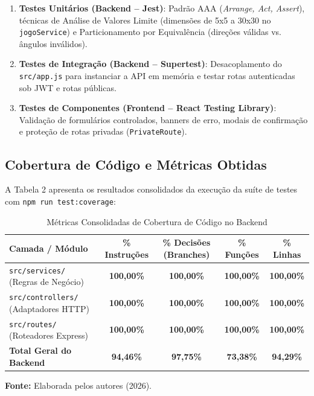 \documentclass[12pt,a4paper]{article}
\begin{document}
\begin{enumerate}
    \item \textbf{Testes Unitários (Backend -- Jest)}: Padrão AAA (\textit{Arrange, Act, Assert}), técnicas de Análise de Valores Limite (dimensões de 5x5 a 30x30 no \texttt{jogoService}) e Particionamento por Equivalência (direções válidas vs. ângulos inválidos).
    \item \textbf{Testes de Integração (Backend -- Supertest)}: Desacoplamento do \texttt{src/app.js} para instanciar a API em memória e testar rotas autenticadas sob JWT e rotas públicas.
    \item \textbf{Testes de Componentes (Frontend -- React Testing Library)}: Validação de formulários controlados, banners de erro, modais de confirmação e proteção de rotas privadas (\texttt{PrivateRoute}).
\end{enumerate}

\subsection{Cobertura de Código e Métricas Obtidas}
A Tabela 2 apresenta os resultados consolidados da execução da suíte de testes com \texttt{npm run test:coverage}:

\begin{table}[H]
\centering
\caption{Métricas Consolidadas de Cobertura de Código no Backend}
\label{tab:cobertura_abnt}
\small
\begin{tabularx}{\textwidth}{lcccc}
\toprule
\textbf{Camada / Módulo} & \textbf{\% Instruções} & \textbf{\% Decisões (Branches)} & \textbf{\% Funções} & \textbf{\% Linhas} \\
\midrule
\texttt{src/services/} (Regras de Negócio) & \textbf{100,00\%} & \textbf{100,00\%} & \textbf{100,00\%} & \textbf{100,00\%} \\
\texttt{src/controllers/} (Adaptadores HTTP) & \textbf{100,00\%} & \textbf{100,00\%} & \textbf{100,00\%} & \textbf{100,00\%} \\
\texttt{src/routes/} (Roteadores Express) & \textbf{100,00\%} & \textbf{100,00\%} & \textbf{100,00\%} & \textbf{100,00\%} \\
\midrule
\textbf{Total Geral do Backend} & \textbf{94,46\%} & \textbf{97,75\%} & \textbf{73,38\%} & \textbf{94,29\%} \\
\bottomrule
\end{tabularx}
\vspace{0.1cm}
{\footnotesize \textbf{Fonte:} Elaborada pelos autores (2026).}
\end{table}
\end{document}
